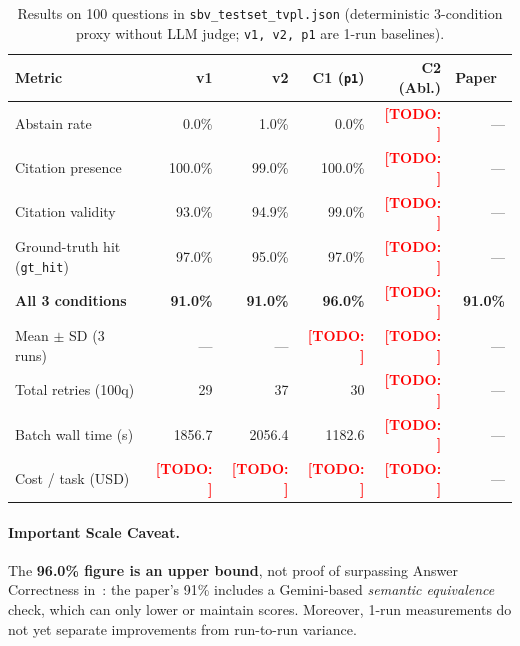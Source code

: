 \documentclass[sigconf,nonacm]{acmart}
\newcommand{\TODO}[1]{\textcolor{red}{\textbf{[TODO: #1]}}}
\begin{document}
\begin{table}[t]
\caption{Results on 100 questions in \texttt{sbv\_testset\_tvpl.json} (deterministic 3-condition proxy without LLM judge; \texttt{v1, v2, p1} are 1-run baselines).}
\label{tab:main}
\scriptsize
\begin{tabular}{@{}lrrrrr@{}}
\toprule
\textbf{Metric} & \textbf{v1} & \textbf{v2} & \textbf{C1 (\texttt{p1})} & \textbf{C2 (Abl.)} & \textbf{Paper~\cite{phan2026sbv}} \\
\midrule
Abstain rate        & 0.0\%  & 1.0\%  & 0.0\%  & \TODO{} & --- \\
Citation presence   & 100.0\% & 99.0\% & 100.0\% & \TODO{} & --- \\
Citation validity   & 93.0\% & 94.9\% & 99.0\% & \TODO{} & --- \\
Ground-truth hit (\texttt{gt\_hit}) & 97.0\% & 95.0\% & 97.0\% & \TODO{} & --- \\
\textbf{All 3 conditions} & \textbf{91.0\%} & \textbf{91.0\%} & \textbf{96.0\%} & \TODO{} & \textbf{91.0\%} \\
\midrule
Mean $\pm$ SD (3 runs) & --- & --- & \TODO{} & \TODO{} & --- \\
Total retries (100q) & 29 & 37 & 30 & \TODO{} & --- \\
Batch wall time (s) & 1856.7 & 2056.4 & 1182.6 & \TODO{} & --- \\
Cost / task (USD) & \TODO{} & \TODO{} & \TODO{} & \TODO{} & --- \\
\bottomrule
\end{tabular}
\end{table}

\paragraph{Important Scale Caveat.} The \textbf{96.0\% figure is an upper bound}, not proof of surpassing Answer Correctness in~\cite{phan2026sbv}: the paper's 91\% includes a Gemini-based \emph{semantic equivalence} check, which can only lower or maintain scores. Moreover, 1-run measurements do not yet separate improvements from run-to-run variance.
\end{document}
